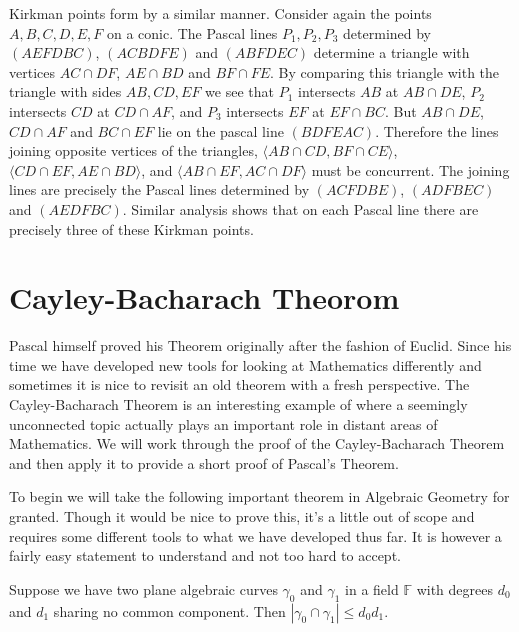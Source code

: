 \documentclass[
10pt, %
a4paper, %
oneside, %
headinclude,footinclude, %
BCOR5mm, %
]{scrartcl}
\begin{document}
Kirkman points form by a similar manner. Consider again the points \(A, B, C, D, E, F\) on a conic. The Pascal lines \(P_{1}, P_{2}, P_{3}\) determined by \(\left( A E F D B C \right)\), \(\left( A C B D F E \right)\) and \(\left( A B F D E C \right)\) determine a triangle with vertices \(AC \cap DF\), \(AE \cap BD\) and \(BF \cap FE\).
By comparing this triangle with the triangle with sides \(AB, CD, EF\) we see that \(P_{1}\) intersects \(AB\) at \(AB \cap DE\), \(P_{2}\) intersects \(CD\) at \(CD \cap AF\), and \(P_{3}\) intersects \(EF\) at \(EF \cap BC\). But \(AB \cap DE\), \(CD \cap AF\) and \(BC \cap EF\) lie on the pascal line \(\left( B D F E A C \right)\).
Therefore the lines joining opposite vertices of the triangles, \(\langle AB \cap CD, BF \cap CE \rangle\), \(\langle CD \cap EF, AE \cap BD \rangle\), and \(\langle AB \cap EF, AC \cap DF \rangle\) must be concurrent. The joining lines are precisely the Pascal lines determined by \(\left( A C F D B E \right)\), \(\left( A D F B E C \right)\) and
\(\left( A E D F B C \right)\). Similar analysis shows that on each Pascal line there are precisely three of these Kirkman points.

\section{Cayley-Bacharach Theorom}

Pascal himself proved his Theorem originally after the fashion of Euclid. Since his time we have developed new tools for looking at Mathematics differently and sometimes it is nice to revisit an old theorem with a fresh perspective.
The Cayley-Bacharach Theorem is an interesting example of where a seemingly unconnected topic actually plays an important role in distant areas of Mathematics. We will work through the proof of the Cayley-Bacharach Theorem and then apply it to provide a short proof of Pascal's Theorem.

To begin we will take the following important theorem in Algebraic Geometry for granted. Though it would be nice to prove this, it's a little out of scope and requires some different tools to what we have developed thus far. It is however a fairly easy statement to understand and not too hard to accept.

\begin{theorem}
    Suppose we have two plane algebraic curves \(\gamma_{0}\) and \(\gamma_{1}\) in a field \(\mathbb{F}\) with degrees \(d_{0}\) and \(d_{1}\) sharing no common component. Then \(|\gamma_{0} \cap \gamma_{1}| \leq d_{0} d_{1}\).
\end{theorem}
\end{document}
